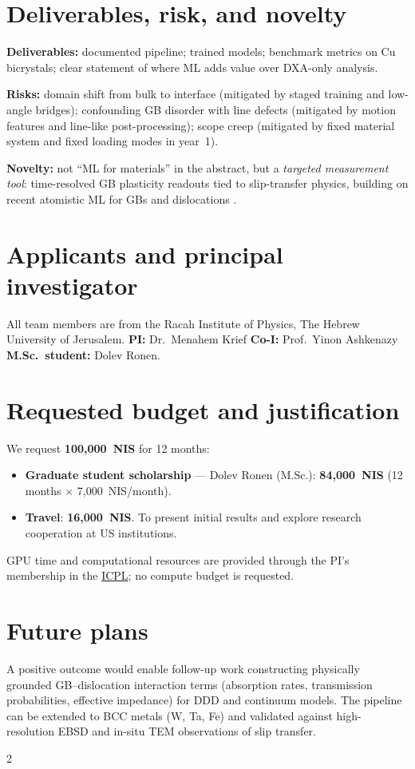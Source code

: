 \documentclass[11pt]{article}
\begin{document}
\section*{Deliverables, risk, and novelty}
\textbf{Deliverables:} documented pipeline; trained models; benchmark metrics on Cu bicrystals; clear statement of where ML adds value over DXA-only analysis.

\textbf{Risks:} domain shift from bulk to interface (mitigated by staged training and low-angle bridges); confounding GB disorder with line defects (mitigated by motion features and line-like post-processing); scope creep (mitigated by fixed material system and fixed loading modes in year~1).

\textbf{Novelty:} not ``ML for materials'' in the abstract, but a \emph{targeted measurement tool}: time-resolved GB plasticity readouts tied to slip-transfer physics, building on recent atomistic ML for GBs and dislocations \cite{Noh2024,Sharp2018}.

\section*{Applicants and principal investigator}

All team members are from the Racah Institute of Physics, The Hebrew University of Jerusalem.
\textbf{PI:} Dr.\ Menahem Krief
\textbf{Co-I:} Prof.\ Yinon Ashkenazy
\textbf{M.Sc.\ student:} Dolev Ronen.

\section*{Requested budget and justification}

We request \textbf{100,000~NIS} for 12 months:
\begin{itemize}
    \item \textbf{Graduate student scholarship} --- Dolev Ronen (M.Sc.): \textbf{84,000~NIS} (12 months $\times$ 7,000~NIS/month).
    \item \textbf{Travel}: \textbf{16,000~NIS}. To present initial results and explore research cooperation at US institutions.
\end{itemize}
GPU time and computational resources are provided through the PI's membership in the \href{http://icpl.huji.ac.il}{ICPL}; no compute budget is requested.

\section*{Future plans}

A positive outcome would enable follow-up work constructing physically grounded GB--dislocation interaction terms (absorption rates, transmission probabilities, effective impedance) for DDD and continuum models.
The pipeline can be extended to BCC metals (W, Ta, Fe) and validated against high-resolution EBSD and in-situ TEM observations of slip transfer.


\begin{multicols}{2}
{\scriptsize


}
\end{multicols}
\end{document}

